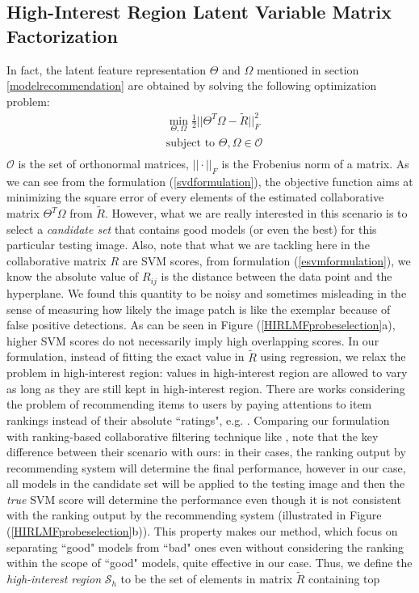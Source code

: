 \documentclass{article} %
\begin{document}
\subsection{High-Interest Region Latent Variable Matrix Factorization}
In fact, the latent feature representation $\Theta$ and $\Omega$ mentioned in section \ref{modelrecommendation} are obtained by solving the following optimization problem:
\begin{equation}
\begin{aligned}
& \min_{\Theta,\Omega}\frac{1}{2}||\Theta^T\Omega-\tilde{R}||^2_F \\
& \text{subject to    } \Theta,\Omega{\in}\mathcal{O}\\
\end{aligned}
\label{svdformulation}
\end{equation}
$\mathcal{O}$ is the set of orthonormal matrices, $||\cdot||_F$ is the Frobenius norm of a matrix. As we can see from the formulation (\ref{svdformulation}), the objective function aims at minimizing the square error of every elements of the estimated collaborative matrix $\Theta^T\Omega$ from $\tilde{R}$. However, what we are really interested in this scenario is to select a \emph{candidate set} that contains good models (or even the best) for this particular testing image. Also, note that what we are tackling here in the collaborative matrix $R$ are SVM scores, from formulation (\ref{esvmformulation}), we know the absolute value of $R_{ij}$ is the distance between the data point and the hyperplane. We found this quantity to be noisy and sometimes misleading in the sense of measuring how likely the image patch is like the exemplar because of false positive detections. As can be seen in Figure (\ref{HIRLMFprobeselection}a), higher SVM scores do not necessarily imply high overlapping scores. In our formulation, instead of fitting the exact value in $\tilde{R}$ using regression, we relax the problem in high-interest region: values in high-interest region are allowed to vary as long as they are still kept in high-interest region. There are works considering the problem of recommending items to users by paying attentions to item rankings instead of their absolute ``ratings", e.g. \cite{freund2003efficient,cohen1999learning}. Comparing our formulation with ranking-based collaborative filtering technique like \cite{freund2003efficient,cohen1999learning}, note that the key difference between their scenario with ours: in their cases, the ranking output by recommending system will determine the final performance, however in our case, all models in the candidate set will be applied to the testing image and then the \emph{true} SVM score will determine the performance even though it is not consistent with the ranking output by the recommending system (illustrated in Figure (\ref{HIRLMFprobeselection}b)). This property makes our method, which focus on separating ``good" models from ``bad" ones even without considering the ranking within the scope of ``good" models, quite effective in our case. Thus, we define the \emph{high-interest region} $\mathcal{S}_h$ to be the set of elements in matrix $\tilde{R}$ containing top 
\end{document}
